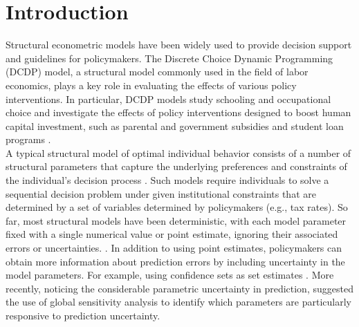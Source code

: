 \section{Introduction}
\thispagestyle{plain} %

Structural econometric models have been widely used to provide decision support and guidelines for policymakers. The Discrete Choice Dynamic Programming (DCDP) model, a structural model commonly used in the field of labor economics, plays a key role in evaluating the effects of various policy interventions. In particular, DCDP models study schooling and occupational choice and investigate the effects of policy interventions designed to boost human capital investment, such as parental and government subsidies and student loan programs \citep{keane1997CareerDecisionsYoung, sauer2004EducationalFinancingLifetime}.\\

\noindent
A typical structural model of optimal individual behavior consists of a number of structural parameters that capture the underlying preferences and constraints of the individual’s decision process \citep{blundell2017WhatHaveWe}. Such models require individuals to solve a sequential decision problem under given institutional constraints that are determined by a set of variables determined by policymakers (e.g., tax rates). So far, most structural models have been deterministic, with each model parameter fixed with a single numerical value or point estimate, ignoring their associated errors or uncertainties. \citep{adda2017CareerCostsChildren, attanasio2012EducationChoicesMexico, eckstein2019CareerFamilyDecisions}. In addition to using point estimates, policymakers can obtain more information about prediction errors by including uncertainty in the model parameters. For example, using confidence sets as set estimates \citep{manski2021EconometricsDecisionMaking}. More recently, noticing the considerable parametric uncertainty in prediction, \cite{eisenhauer2021StructuralModelsPolicymaking} suggested the use of global sensitivity analysis to identify which parameters are particularly responsive to prediction uncertainty.\\


